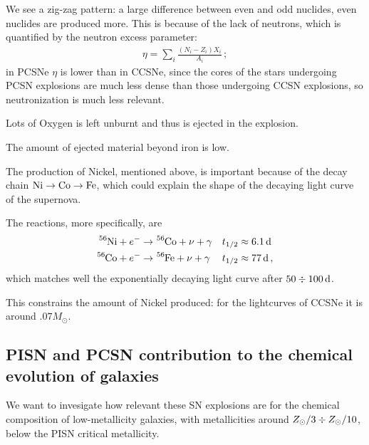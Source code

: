 \documentclass[main.tex]{subfiles}
\begin{document}
We see a zig-zag pattern: a large difference between even and odd nuclides,
even nuclides are produced more.
This is because of the lack of neutrons, which is quantified by the neutron excess parameter: 
%
\begin{align}
\eta = \sum _{i} \frac{(N_i - Z_i)X_i}{A_i}
\,;
\end{align}
%
in PCSNe \(\eta \) is lower than in CCSNe, since 
the cores of the stars undergoing PCSN explosions are much less dense than those undergoing CCSN explosions, so neutronization is much less relevant.

Lots of Oxygen is left unburnt and thus is ejected in the explosion.

The amount of ejected material beyond iron is low. 

The production of Nickel, mentioned above, is important because of the decay chain \(\ce{Ni} \rightarrow \ce{Co} \rightarrow \ce{Fe}\), which could explain the shape of the decaying light curve of the supernova.

The reactions, more specifically, are 
%
\begin{align}
\ce{^{56}Ni} + e^{-} &\rightarrow \ce{^{56}Co} + \nu + \gamma  && t_{1/2} \approx \SI{6.1}{d}   \\
\ce{^{56}Co} + e^{-} &\rightarrow \ce{^{56}Fe} + \nu + \gamma && t_{1/2} \approx \SI{77}{d} 
\,,
\end{align}
%
which matches well the exponentially decaying light curve after \(50 \divisionsymbol \SI{100}{d}\).

This constrains the amount of Nickel produced: for the lightcurves of CCSNe it is around \(\num{.07}M_{\odot}\).

\subsection{PISN and PCSN contribution to the chemical evolution of galaxies}

We want to invesigate how relevant these SN explosions are for the chemical composition of low-metallicity galaxies, with metallicities around \(Z_{\odot} / 3 \divisionsymbol Z_{\odot} / 10\), below the PISN critical metallicity. 

\end{document}
